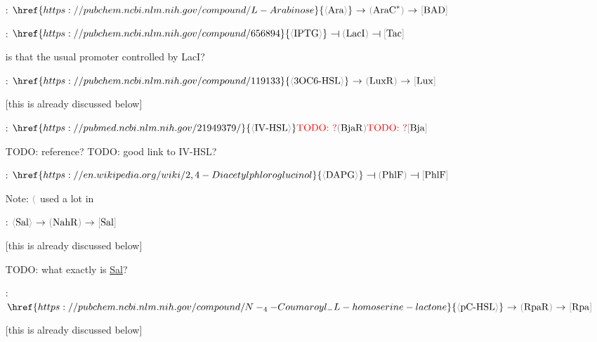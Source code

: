 \documentclass[12pt,notitlepage]{article}
\newcommand{\TODO}[1]{\textrm{\color{red}TODO: #1}}
\newcommand{\cbra}[1]{{\ensuremath{\color{gray}{#1}}}}
\newcommand{\signal}[1]{{{\cbra{\langle}\ce{#1}\cbra{\rangle}}}}
\newcommand{\protein}[1]{{{\cbra{(}\ce{#1}\cbra{)}}}}
\newcommand{\promoter}[1]{{{\cbra{[}\ce{#1}\cbra{]}}}}
\newcommand{\act}{\ {\ensuremath{\mathbin{\to}}}\ }
\newcommand{\rep}{\ {\ensuremath{\mathrel{\raisebox{-.3ex}{\rotatebox{90}{\scalebox{1}[1.2]{$\bot$}}}}}}\ }
\newcommand{\ra}[1]{{\color{Blue}#1}}
\begin{document}
\begin{itemize}
\item[\ce{w_A}:]
    $
        \href{https://pubchem.ncbi.nlm.nih.gov/compound/L-Arabinose}{\signal{Ara}}
        \act
        \protein{AraC^*}
        \act
        \promoter{BAD}
    $

\item[\ce{w_B}:]
    $
        \href{https://pubchem.ncbi.nlm.nih.gov/compound/656894}{\signal{IPTG}}
        \rep
        \protein{LacI}
        \rep
        \promoter{Tac}
    $
    
    \ra{
    is that the usual promoter controlled by LacI?
    }
    
\item[\ce{r_0}:]
    $
        \href{https://pubchem.ncbi.nlm.nih.gov/compound/119133}{\signal{{3OC6}{-}{HSL}}}
        \act
        \protein{LuxR}
        \act
        \promoter{Lux}
    $
    
    \ra{[this is already discussed below]}

\item[\ce{r_1}:]
    $
        \href{https://pubmed.ncbi.nlm.nih.gov/21949379/}{\signal{IV{-}HSL}}
        \TODO{?}
        \protein{BjaR}
        \TODO{?}
        \promoter{Bja}
    $
    
    \TODO{reference?}
    \TODO{good link to IV-HSL?}

\item[\ce{s_0}:]
    $
        \href{https://en.wikipedia.org/wiki/2,4-Diacetylphloroglucinol}{\signal{DAPG}}
        \rep
        \protein{PhlF}
        \rep
        \promoter{PhlF}
    $
 
    Note: \protein{PhlF} used a lot in \cite{NielsenETAL2016}
    
\item[\ce{c_1}:]
    $
        \signal{Sal}
        \act
        \protein{NahR}
        \act
        \promoter{Sal}
    $
    
    \ra{[this is already discussed below]}
    
    \TODO{what exactly is \href{https://en.wikipedia.org/wiki/Salicylic_acid}{Sal}?}
    
\item[\ce{s_1}:]
    $
        \href{https://pubchem.ncbi.nlm.nih.gov/compound/N-_4-Coumaroyl_-L-homoserine-lactone}{\signal{pC{-}HSL}}
        \act
        \protein{RpaR}
        \act
        \promoter{Rpa}
    $

    \ra{[this is already discussed below]}
    

\end{itemize}
\end{document}
